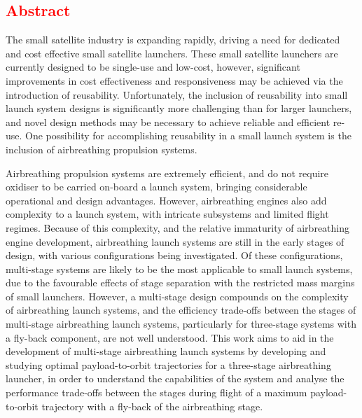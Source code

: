 \cleardoublepage
\textcolor{red}{
\section*{Abstract}
}
\noindent
 The small satellite industry is expanding rapidly, driving a need for dedicated and cost effective small satellite launchers.  
These small satellite launchers are currently designed to be single-use and low-cost, however, significant improvements in cost effectiveness and responsiveness may be achieved via the introduction of reusability. Unfortunately, the inclusion of reusability into small launch system designs is significantly more challenging than for larger launchers, and novel design methods may be necessary to achieve reliable and efficient re-use. One possibility for accomplishing reusability in a small launch system is the inclusion of airbreathing propulsion systems.

Airbreathing propulsion systems are extremely efficient, and do not require oxidiser to be carried on-board a launch system, bringing considerable operational and design advantages. 
However, airbreathing engines also add complexity to a launch system, with intricate subsystems and limited flight regimes. Because of this complexity, and the relative immaturity of airbreathing engine development, airbreathing launch systems are still in the early stages of design, with various configurations being investigated. Of these configurations, multi-stage systems are likely to be the most applicable to small launch systems, due to the favourable effects of stage separation with the restricted mass margins of small launchers. However, a multi-stage design compounds on the complexity of airbreathing launch systems, and the efficiency trade-offs between the stages of multi-stage airbreathing launch systems, particularly for three-stage systems with a fly-back component, are not well understood. This work aims to aid in the development of multi-stage airbreathing launch systems by developing and studying optimal payload-to-orbit trajectories for a three-stage airbreathing launcher, in order to understand the capabilities of the system and analyse the performance trade-offs between the stages during flight of a maximum payload-to-orbit trajectory with a fly-back of the airbreathing stage.



